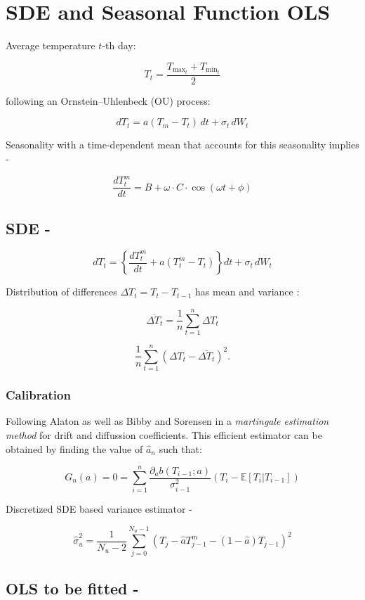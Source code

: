 \documentclass{article}
\begin{document}
\section*{SDE and Seasonal Function OLS}

Average temperature \( t \)-th day:

\[
T_t = \frac{T_{\text{max}_t} + T_{\text{min}_t}}{2}
\]

following an Ornstein–Uhlenbeck (OU) process:

\[
dT_t = a(T_m - T_t) \, dt + \sigma_t \, dW_t
\]

Seasonality with a time-dependent mean that accounts for this seasonality implies - 

\[
\frac{dT_t^m}{dt} = B + \omega \cdot C \cdot \cos(\omega t + \phi)
\]

\subsection{SDE - }

\[
dT_t = \left\{ \frac{dT_t^m}{dt} + a(T_t^m - T_t) \right\} dt + \sigma_t \, dW_t
\]

Distribution of  differences \( \Delta T_t = T_t - T_{t-1} \) has mean and variance :

\[
\overline{\Delta T_t} = \frac{1}{n} \sum_{t=1}^n \Delta T_t
\]

\[
\frac{1}{n} \sum_{t=1}^n (\Delta T_t - \overline{\Delta T_t})^2.
\]

\subsubsection*{Calibration}

Following Alaton as well as Bibby and Sorensen in a \textit{martingale estimation method} for drift and diffussion coefficients. This efficient estimator can be obtained by finding the value of \(\hat{a}_n\) such that:


\[
G_n(a) = 0 = \sum_{i=1}^{n} \frac{\partial_a b(T_{i-1}; a)}{\sigma^2_{i-1}} \left( T_i - \mathbb{E}[T_i | T_{i-1}] \right)
\]

Discretized SDE based variance estimator -

\[
\hat{\sigma}_u^2 = \frac{1}{N_u - 2} \sum_{j=0}^{N_u-1} \left( T_j - \hat{a} T^m_{j-1} - (1 - \hat{a}) T_{j-1} \right)^2
\]

\subsection{OLS to be fitted - }
\end{document}
